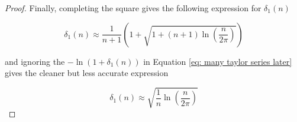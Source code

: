 \documentclass[12pt]{article}
\theoremstyle{plain}
\theoremstyle{definition}
\theoremstyle{remark}
\theoremstyle{definition}
\begin{document}
\begin{proof}
Finally, completing the square gives the following expression for $\delta_1(n)$

\begin{equation}\label{eq: final best}
    \delta_1(n) \approx \frac{1}{n+1}\left( 1 + \sqrt{1+(n+1)\ln\left(\frac{n}{2\pi}\right)}\right)
\end{equation}

and ignoring the $-\ln(1+\delta_1(n))$ in Equation \ref{eq: many taylor series later} gives the cleaner but less accurate expression 

\begin{equation}\label{eq: final clean}
    \delta_1(n) \approx \sqrt{\frac{1}{n}\ln\left(\frac{n}{2\pi}\right)}
\end{equation}

\end{proof}









\newpage

\printbibliography
\end{document}

